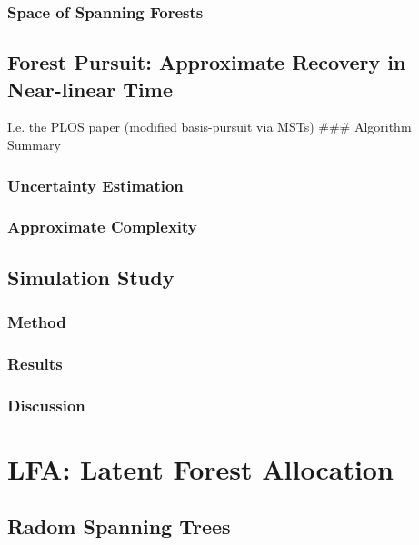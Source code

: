 \documentclass[%
	12pt,
		oneside,
		letterpaper
]{book}
\begin{document}
\subsection{Space of Spanning Forests}\label{space-of-spanning-forests}

\section{Forest Pursuit: Approximate Recovery in Near-linear
Time}\label{forest-pursuit-approximate-recovery-in-near-linear-time-1}

I.e. the PLOS paper (modified basis-pursuit via MSTs) \#\#\# Algorithm
Summary

\subsection{Uncertainty Estimation}\label{uncertainty-estimation}

\subsection{Approximate Complexity}\label{approximate-complexity}

\section{Simulation Study}\label{simulation-study}

\subsection{Method}\label{method}

\subsection{Results}\label{results}

\subsection{Discussion}\label{discussion}

\chapter{LFA: Latent Forest
Allocation}\label{lfa-latent-forest-allocation}

\section{Radom Spanning Trees}\label{radom-spanning-trees}
\end{document}
